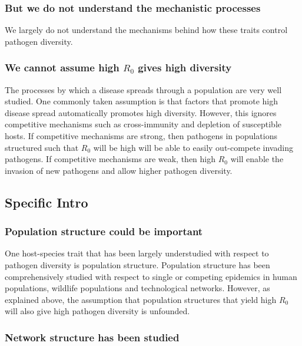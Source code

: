 \subsubsection{But we do not understand the mechanistic processes}

We largely do not understand the mechanisms behind how these traits control pathogen diversity.




\subsubsection{We cannot assume high $R_0$ gives high diversity}
The processes by which a disease spreads through a population are very well studied.
One commonly taken assumption is that factors that promote high disease spread automatically promotes high diversity.
However, this ignores competitive mechanisms such as cross-immunity and depletion of susceptible hosts.
If competitive mechanisms are strong, then pathogens in populations structured such that $R_0$ will be high will be able to easily out-compete invading pathogens.
If competitive mechanisms are weak, then high $R_0$ will enable the invasion of new pathogens and allow higher pathogen diversity.




\subsection{Specific Intro}


\subsubsection{Population structure could be important}
One host-species trait that has been largely understudied with respect to pathogen diversity is population structure.
Population structure has been comprehensively studied with respect to single or competing epidemics in human populations, wildlife populations and technological networks.
However, as explained above, the assumption that population structures that yield high $R_0$ will also give high pathogen diversity is unfounded.



\subsubsection{Network structure has been studied}
 
